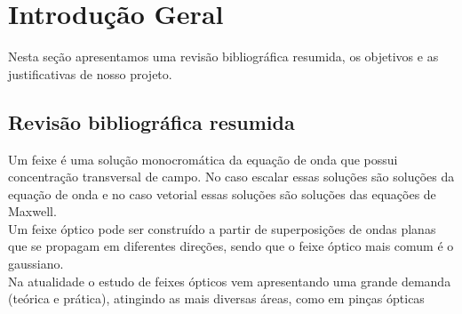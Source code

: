 \chapter{Introdução Geral}

Nesta seção apresentamos  uma revisão bibliográfica resumida, os objetivos e as justificativas  de nosso projeto.
\section{Revisão bibliográfica resumida}
Um feixe é uma solução monocromática da equação de onda que possui concentração transversal de campo. No caso escalar essas soluções são soluções da equação de onda e no caso vetorial essas soluções são soluções das equações de Maxwell.\\
Um feixe óptico pode ser construído a partir de superposições de ondas planas que se propagam em diferentes direções, sendo que o feixe óptico mais comum é o gaussiano.\\
Na atualidade o estudo de feixes ópticos vem apresentando uma grande demanda (teórica e prática), atingindo as mais diversas áreas, como em pinças ópticas 

